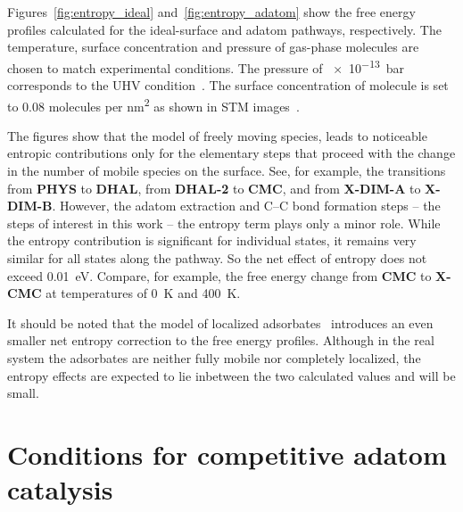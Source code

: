 \documentclass[journal=jpclcd,layout=traditional,manuscript=letter]{achemso} %
\begin{document}
Figures~\ref{fig:entropy_ideal} and~\ref{fig:entropy_adatom} show the free energy profiles calculated for the ideal-surface and adatom pathways, respectively. The temperature, surface concentration and pressure of gas-phase molecules are chosen to match experimental conditions. The pressure of \SI{e-13}{\bar} corresponds to the UHV condition~\cite{ullmann_147, ullmann_173, Ullmann_57}. The surface concentration of molecule is set to 0.08 molecules per \si{\nano\metre\squared} as shown in  STM images~\cite{ullmann_67}.

The figures show that the model of freely moving species, leads to noticeable entropic contributions only for the elementary steps that proceed with the change in the number of mobile species on the surface. See, for example, the transitions from \textbf{PHYS} to \textbf{DHAL}, from \textbf{DHAL-2} to \textbf{CMC}, and from \textbf{X-DIM-A} to \textbf{X-DIM-B}. However, the adatom extraction and C--C bond formation steps -- the steps of interest in this work -- the entropy term plays only a minor role. While the entropy contribution is significant for individual states, it remains very similar for all states along the pathway. So the net effect of entropy does not exceed \SI{0.01}{\electronvolt}. Compare, for example, the free energy change from \textbf{CMC} to \textbf{X-CMC} at temperatures of \SI{0}{\kelvin} and \SI{400}{\kelvin}.

It should be noted that the model of localized adsorbates~\cite{ullmann_174} introduces an even smaller net entropy correction to the free energy profiles. Although in the real system the adsorbates are neither fully mobile nor completely localized, the entropy effects are expected to lie inbetween the two calculated values and will be small.

\ifdefined\FALSE

\section{Conditions for competitive adatom catalysis}

\end{document}
